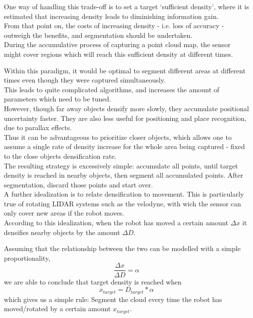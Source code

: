 One way of handling this trade-off is to set a target `sufficient density', where it is estimated that increasing density leads to diminishing information gain.\\

From that point on, the costs of increasing density - i.e. loss of accuracy - outweigh the benefits, and segmentation should be undertaken.\\

During the accumulative process of capturing a point cloud map, the sensor might cover regions which will reach this sufficient density at different times.

Within this paradigm, it would be optimal to segment different areas at different times even though they were captured simultaneously.\\


This leads to quite complicated algorithms, and increases the amount of parameters which need to be tuned.\\

However, though far away objects densify more slowly, they accumulate positional uncertainty faster. They are also less useful for positioning and place recognition, due to parallax effects.\\

Thus it can be advantageous to prioritize closer objects, which allows one to assume a single rate of density increase for the whole area being captured - fixed to the close objects densification rate.\\

The resulting strategy is excessively simple: accumulate all points, until target density is reached in nearby objects, then segment all accumulated points. After segmentation, discard those points and start over.\\

A further idealization is to relate densification to movement. This is particularly true of rotating LIDAR systems such as the velodyne, with wich the sensor can only cover new areas if the robot moves.\\

According to this idealization, when the robot has moved a certain amount $\Delta x$ it densifies nearby objects by the amount $\Delta D$.

Assuming that the relationship between the two can be modelled with a simple proportionality,
$$\frac{\Delta x}{\Delta D} = \alpha$$
we are able to conclude that target density is reached when
$$x_{target} = D_{target} * \alpha$$
which gives us a simple rule: Segment the cloud every time the robot has moved/rotated by a certain amount $x_{target}$.\\

